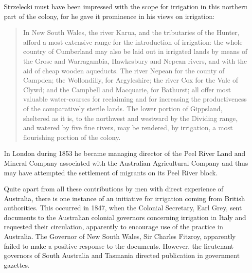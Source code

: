 Strzelecki must have been impressed with the scope for irrigation in
this northern part of the colony, for he gave it prominence in his
views on irrigation:
\begin{quote}
	In New South Wales, the river Karua,  and
	the tributaries of the Hunter,  afford a
	most extensive range for the introduction of irrigation: the
	whole country of Cumberland may also be laid out in irrigated
	lands by means of the Grose  and
	Warragambia,  Hawkesbury
	 and Nepean 
	rivers, and with the aid of cheap wooden aqueducts.  The river
	Nepean for the county of Campden; the Wollondilly,
	 for Argyleshire; the river Cox
	 for the Vale of Clywd; and the Campbell
	 and Macquarie, 
	for Bathurst; all offer most valuable water-courses for
	reclaiming and for increasing the productiveness of the
	comparatively sterile lands. The lower portion of Gippsland,
	 sheltered as it is, to the northwest
	and westward by the Dividing range, and watered by five fine
	rivers, may be rendered, by irrigation, a most flourishing
	portion of the colony.
\end{quote}

In London during 1853 he became managing director of the Peel River
Land and Mineral Company associated with the Australian Agricultural
Company and thus may have attempted the settlement of migrants on its
Peel River 
block.

Quite apart from all these contributions by men with direct experience
of Australia, there is one instance of an initiative for irrigation
coming from British authorities.  This occurred in 1847, when the
Colonial Secretary, Earl Grey,  sent documents to
the Australian colonial governors concerning irrigation in Italy and
requested their circulation, apparently to encourage use of the
practice in Australia.  The Governor of New South Wales, Sir Charles
Fitzroy,  apparently failed to make a positive
response to the documents.  However, the lieutenant-governors of South
Australia and Tasmania directed publication in government
gazettes.

